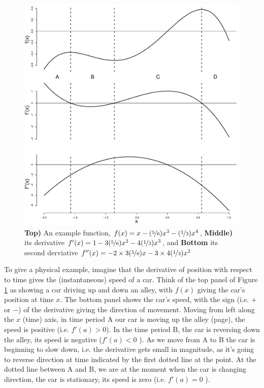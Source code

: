 \begin{figure}
 \begin{center}
   \includegraphics[width=0.8
   \textwidth]{math_background/calc_pics/Derivat_all_3.pdf} \end{center}  %
 \caption{{\bf Top)} An example function, $f(x) = x -(\nicefrac{5}{6})x^3  -
   (\nicefrac{1}{3}) x^4$, {\bf Middle)} its derivative $f'(x) = 1
   - 3(\nicefrac{5}{6}) x^2 -4 (\nicefrac{1}{3}) x^3$, and {\bf Bottom}
   its second derviative  $f''(x) =   - 2 \times 3(\nicefrac{5}{6}) x -
   3\times 4 (\nicefrac{1}{3}) x^2$
   }\label{Fig:derivative}
\end{figure}
To give a physical example, imagine that the derivative of position with respect to
time gives the (instantaneous) speed of a car. Think of the top panel of Figure \ref{Fig:derivative}
as showing a car driving up and down an
alley, with $f(x)$ giving the car's position at time $x$. The bottom panel
shows the car's speed, with the sign (i.e. $+$ or $-$) of the derivative giving the direction of
movement. Moving from left along the $x$ (time) axis, in time period A our car is moving up the alley (page), the speed is
positive (i.e. $f'(a)>0$). In the time period B, the car is reversing down the alley, its speed is negative ($f'(a)<0$ ).  
As we move from A to B the car is beginning to slow down, i.e. the derivative gets small
in magnitude, as it's going to reverse direction at time indicated by
the first dotted line at the point. At the
dotted line between A and B, we are at the moment when the car is changing direction, the car is
stationary, its speed is zero (i.e. $f'(a)=0$ ). 

